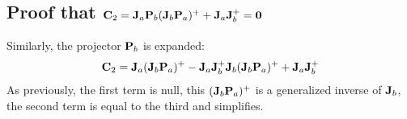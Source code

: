 \documentclass[journal]{IEEEtran}
\begin{document}
\subsection{Proof that ${\mathbf{C}}_2 = {\mathbf{J}}_{a} {\mathbf{P}}_{b} ({\mathbf{J}}_{b} {\mathbf{P}}_{a} )^+ + {\mathbf{J}}_{a} {\mathbf{J}}_{b}^+ = {\mathbf{0}}$}
Similarly, the projector ${\mathbf{P}}_{b}$ is expanded:
\[
{\mathbf{C}}_2 = {\mathbf{J}}_{a} ({\mathbf{J}}_{b} {\mathbf{P}}_{a} )^+ - {\mathbf{J}}_{a} {\mathbf{J}}_{b}^+{\mathbf{J}}_{b} ({\mathbf{J}}_{b} {\mathbf{P}}_{a} )^+ + {\mathbf{J}}_{a} {\mathbf{J}}_{b}^+
\]
As previously, the first term is null, this $({\mathbf{J}}_{b} {\mathbf{P}}_{a} )^+$ is a generalized inverse of ${\mathbf{J}}_{b}$, the second term is equal to the third and simplifies. \QED





\ifCLASSOPTIONcaptionsoff
  \newpage
\fi





%
%
%




% 
\end{document}
